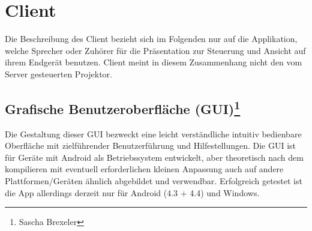 \chapter[Client]{Client}
\thispagestyle{fancy}
\label{client}

Die Beschreibung des Client bezieht sich im Folgenden nur auf die Applikation, welche Sprecher oder Zuhörer für die Präsentation zur Steuerung und Ansicht auf ihrem Endgerät benutzen. Client meint in diesem Zusammenhang nicht den vom Server gesteuerten Projektor.

\section[Grafische Benutzeroberfläche (GUI)]{Grafische Benutzeroberfläche (GUI)\footnote{Sascha Brexeler}}
\label{GUI}
Die Gestaltung dieser GUI bezweckt eine leicht verständliche intuitiv bedienbare Oberfläche mit zielführender Benutzerführung und Hilfestellungen.
Die GUI ist für Geräte mit Android als Betriebssystem entwickelt, aber theoretisch nach dem kompilieren mit eventuell erforderlichen kleinen Anpassung auch auf andere Plattformen/Geräten ähnlich abgebildet und verwendbar. Erfolgreich getestet ist die App allerdings derzeit nur für Android (4.3 + 4.4) und Windows.


